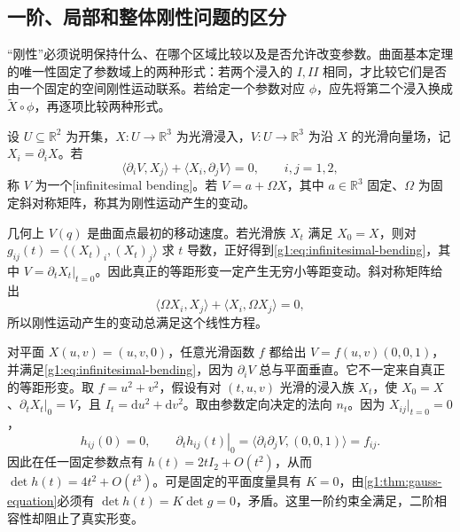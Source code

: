 \subsection{一阶、局部和整体刚性问题的区分}
\label{g1:subsec:0805:03}

“刚性”必须说明保持什么、在哪个区域比较以及是否允许改变参数。曲面基本定理的唯一性固定了参数域上的两种形式：若两个浸入的 \(I,II\) 相同，才比较它们是否由一个固定的空间刚性运动联系。若给定一个参数对应 \(\phi\)，应先将第二个浸入换成 \(\widetilde X\circ\phi\)，再逐项比较两种形式。

\begin{definition}\label{g1:def:infinitesimal-bending}
	设 \(U\subseteq\mathbb R^2\) 为开集，\(X:U\rightarrow\mathbb R^3\) 为光滑浸入，\(V:U\rightarrow\mathbb R^3\) 为沿 \(X\) 的光滑向量场，记 \(X_i=\partial_iX\)。若
	\begin{equation}\label{g1:eq:infinitesimal-bending}
		\langle\partial_iV,X_j\rangle+\langle X_i,\partial_jV\rangle=0,\qquad i,j=1,2,
	\end{equation}
	称 \(V\) 为一个[infinitesimal bending]。若 \(V=a+\Omega X\)，其中 \(a\in\mathbb R^3\) 固定、\(\Omega\) 为固定斜对称矩阵，称其为刚性运动产生的变动。
\end{definition}

几何上 \(V(q)\) 是曲面点最初的移动速度。若光滑族 \(X_t\) 满足 \(X_0=X\)，则对 \(g_{ij}(t)=\langle(X_t)_i,(X_t)_j\rangle\) 求 \(t\) 导数，正好得到\eqref{g1:eq:infinitesimal-bending}，其中 \(V=\partial_tX_t|_{t=0}\)。因此真正的等距形变一定产生无穷小等距变动。斜对称矩阵给出
\[
	\langle\Omega X_i,X_j\rangle+\langle X_i,\Omega X_j\rangle=0,
\]
所以刚性运动产生的变动总满足这个线性方程。

\begin{example}\label{g1:exm:nonintegrable-plane-bending}
	对平面 \(X(u,v)=(u,v,0)\)，任意光滑函数 \(f\) 都给出 \(V=f(u,v)(0,0,1)\)，并满足\eqref{g1:eq:infinitesimal-bending}，因为 \(\partial_iV\) 总与平面垂直。它不一定来自真正的等距形变。取 \(f=u^2+v^2\)，假设有对 \((t,u,v)\) 光滑的浸入族 \(X_t\)，使 \(X_0=X\)、\(\partial_tX_t|_0=V\)，且 \(I_t=\mathrm{d}u^2+\mathrm{d}v^2\)。取由参数定向决定的法向 \(n_t\)。因为 \(X_{ij}|_{t=0}=0\)，
	\[
		h_{ij}(0)=0,\qquad
		\left.\partial_t h_{ij}(t)\right|_0
		=\langle\partial_i\partial_jV,(0,0,1)\rangle=f_{ij}.
	\]
	因此在任一固定参数点有 \(h(t)=2tI_2+O(t^2)\)，从而 \(\det h(t)=4t^2+O(t^3)\)。可是固定的平面度量具有 \(K=0\)，由\cref{g1:thm:gauss-equation}必须有 \(\det h(t)=K\det g=0\)，矛盾。这里一阶约束全满足，二阶相容性却阻止了真实形变。
\end{example}

